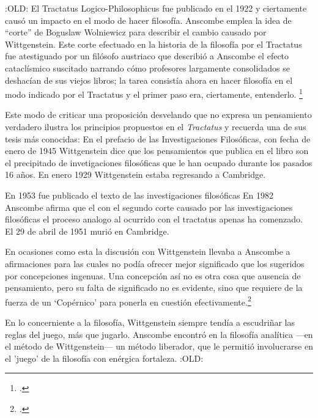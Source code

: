   \begin{revision}
  :OLD:
  El Tractatus Logico-Philosophicus fue publicado en el 1922 y ciertamente causó
  un impacto en el modo de hacer filosofía. Anscombe emplea la idea de ``corte''
  de Boguslaw Wolniewicz para describir el cambio causado por Wittgenstein. Este
  corte efectuado en la historia de la filosofía por el Tractatus fue atestiguado
  por un filósofo austriaco que describió a Anscombe el efecto cataclísmico
  suscitado narrando cómo profesores largamente consolidados se deshacían de sus
  viejos libros; la tarea consistía ahora en hacer filosofía en el modo indicado
  por el Tractatus y el primer paso era, ciertamente, entenderlo.
  \footcite[p.181]{twocuts} 
  \end{revision}

  \begin{revision}
  Este modo de criticar una proposición desvelando que no expresa un pensamiento
  verdadero ilustra los principios propuestos en el \emph{Tractatus} y recuerda
  una de sus tesis más conocidas: 
  En el prefacio de las Investigaciones Filosóficas, con fecha de enero de 1945
  Wittgenstein dice que los pensamientos que publica en el libro son el
  precipitado de invetigaciones filosóficas que le han ocupado durante los pasados
  16 años. En enero 1929 Wittgenstein estaba regresando a Cambridge.
  \end{revision}
  
  \begin{revision}
  En 1953 fue publicado el texto de las investigaciones filosóficas
  En 1982 Anscombe afirma que el con el segundo corte causado por las
  investigaciones filosóficas el proceso analogo al ocurrido con el tractatus
  apenas ha comenzado.
  El 29 de abril de 1951 murió en Cambridge. 
  \end{revision}
  
  \begin{revision}
  En ocasiones como esta la
  discusión con Wittgenstein llevaba a Anscombe a afirmaciones para las cuales no
  podía ofrecer mejor significado que los sugeridos por concepciones ingenuas. Una
  concepción así no es otra cosa que ausencia de pensamiento, pero su falta de
  significado no es evidente, sino que requiere de la fuerza de un `Copérnico'
  para ponerla en cuestión efectivamente.\footcite[cf. 151]{IWT} 
  \end{revision}

  \begin{revision}
  En lo concerniente a la filosofía, Wittgenstein siempre tendía a escudriñar las
  reglas del juego, más que jugarlo. 
  Anscombe encontró en la filosofía analítica ---en el método de Wittgenstein---
  un método liberador, que le permitió involucrarse en el 'juego' de la filosofía
  con enérgica fortaleza. 
  :OLD:
  \end{revision}

